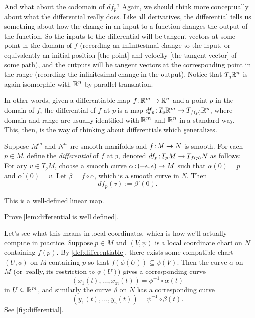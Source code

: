 And what about the codomain of $df_p$? Again, we should think more conceptually about what the differential really does. Like all derivatives, the differential tells us something about how the change in an input to a function changes the output of the function. So the inputs to the differential will be tangent vectors at some point in the domain of $f$ (recording an infinitesimal change to the input, or equivalently an initial position [the point] and velocity [the tangent vector] of some path), and the outputs will be tangent vectors at the corresponding point in the range (recording the infinitesimal change in the output). Notice that $T_q \mathbb{R}^n$ is again isomorphic with $\mathbb{R}^n$ by parallel translation.

In other words, given a differentiable map $f \colon\thinspace\!\! \mathbb{R}^m \to \mathbb{R}^n$ and a point $p$ in the domain of $f$, the differential of $f$ at $p$ is a map $df_p \colon\thinspace\!\! T_p \mathbb{R}^m \to T_{f(p)}\mathbb{R}^n$, where domain and range are usually identified with $\mathbb{R}^m$ and $\mathbb{R}^n$ in a standard way. This, then, is the way of thinking about differentials which generalizes.

\begin{definition}\label{def:differential}
	Suppose $M^m$ and $N^n$ are smooth manifolds and $f \colon\thinspace\!\! M \to N$ is smooth. For each $p \in M$, define the \emph{differential} of $f$ at $p$, denoted $df_p\colon\thinspace\!\! T_p M \to T_{f(p)}N$ as follows: For any $v \in T_p M$, choose a smooth curve $\alpha \colon\thinspace\!\! (-\epsilon, \epsilon) \to M$ such that $\alpha(0) = p$ and $\alpha'(0) = v$. Let $\beta = f \circ \alpha$, which is a smooth curve in $N$. Then
	\[
		df_p(v) := \beta'(0).
	\]
\end{definition}

\begin{lemma}\label{lem:differential is well defined}
	This is a well-defined linear map.
\end{lemma}

\begin{exercise}
	Prove \cref{lem:differential is well defined}.
\end{exercise}

Let's see what this means in local coordinates, which is how we'll actually compute in practice. Suppose $p \in M$ and $(V, \psi)$ is a local coordinate chart on $N$ containing $f(p)$. By \cref{def:differentiable}, there exists some compatible chart $(U, \phi)$ on $M$ containing $p$ so that $f(\phi(U)) \subseteq \psi(V)$. Then the curve $\alpha$ on $M$ (or, really, its restriction to $\phi(U)$) gives a corresponding curve
\[
	(x_1(t), \dots , x_m(t)) = \phi^{-1} \circ \alpha(t)
\]
in $U \subseteq \mathbb{R}^m$, and similarly the curve $\beta$ on $N$ has a corresponding curve
\[
	(y_1(t), \dots , y_n(t)) = \psi^{-1} \circ \beta(t).
\]
See \cref{fig:differential}.

